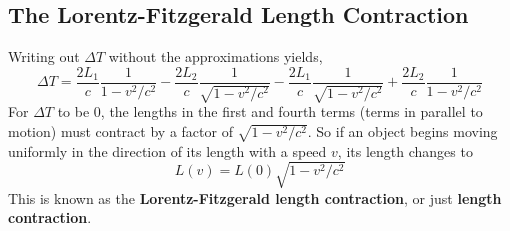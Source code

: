     \subsection*{The Lorentz-Fitzgerald Length Contraction}
        Writing out $\Delta T$ without the approximations yields,
        \begin{equation*}
            \Delta T = \frac{2L_1}{c} \frac{1}{1 - v^2/c^2} - \frac{2L_2}{c} \frac{1}{\sqrt{1 - v^2/c^2}} - \frac{2L_1}{c} \frac{1}{\sqrt{1 - v^2/c^2}} + \frac{2L_2}{c} \frac{1}{1 - v^2/c^2}
        \end{equation*}
        For $\Delta T$ to be 0, the lengths in the first and fourth terms (terms in parallel to motion) must contract by a factor of $\sqrt{1 - v^2/c^2}$. So if an object begins moving uniformly in the direction of its length with a speed $v$, its length changes to $$L(v) = L(0)\sqrt{1 - v^2/c^2}$$ This is known as the \textbf{Lorentz-Fitzgerald length contraction}, or just \textbf{length contraction}. 
        